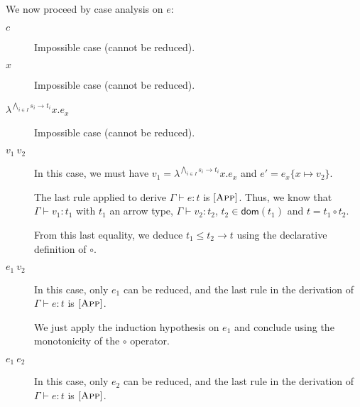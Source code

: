 \documentclass[a4paper]{article}%
\newcommand{\apply}[2]{#1\circ#2}
\newcommand{\dom}[1]{\textsf{dom}(#1)}
\newcommand{\subst}[2]{\{#1 \mapsto #2\}}
\theoremstyle{definition}
\newcommand {\Rule}[1] {[\textsc{#1}]}
\begin{document}
    We now proceed by case analysis on $e$:

    \begin{description}
      \item[$c$] Impossible case (cannot be reduced).
      \item[$x$] Impossible case (cannot be reduced).
      \item[$\lambda^{\bigwedge_{i\in I} s_i \rightarrow t_i}x.e_x$] Impossible case (cannot be reduced).
      \item[$v_1\ v_2$] In this case, we must have $v_1=\lambda^{\bigwedge_{i\in I} s_i \rightarrow t_i}x.e_x$ and $e'=e_x\subst x {v_2}$.

      The last rule applied to derive $\Gamma \vdash e:t$ is $\Rule{App}$.
      Thus, we know that $\Gamma \vdash v_1 : t_1$ with $t_1$ an arrow type, $\Gamma \vdash v_2 : t_2$, $t_2 \in \dom {t_1}$ and $t=\apply {t_1} {t_2}$.

      From this last equality, we deduce $t_1 \leq t_2 \rightarrow t$ using the declarative definition of $\circ$.

      \item[$e_1\ v_2$] In this case, only $e_1$ can be reduced, and the last rule in the derivation of $\Gamma \vdash e:t$ is $\Rule{App}$.

      We just apply the induction hypothesis on $e_1$ and conclude using the monotonicity of the $\circ$ operator.
      \item[$e_1\ e_2$] In this case, only $e_2$ can be reduced, and the last rule in the derivation of $\Gamma \vdash e:t$ is $\Rule{App}$.


\end{description}
\end{document}
